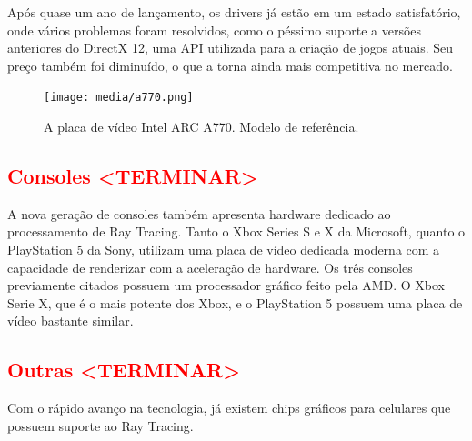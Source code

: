 \documentclass[journal]{IEEEtran}
\begin{document}
Após quase um ano de lançamento, os drivers já estão em um estado satisfatório, onde vários
problemas foram resolvidos, como o péssimo suporte a versões anteriores do DirectX 12, uma
API utilizada para a criação de jogos atuais. Seu preço também foi diminuído, o que a torna
ainda mais competitiva no mercado.

\begin{figure}[ht]
  \centering
  \texttt{[image: media/a770.png]}
  \caption{A placa de vídeo Intel ARC A770. Modelo de referência.}
  \label{img_a440}
\end{figure}


\subsection{\textcolor{red}{\textbf{Consoles <TERMINAR>}}}
A nova geração de consoles também apresenta hardware dedicado ao processamento de Ray Tracing.
Tanto o Xbox Series S e X da Microsoft, quanto o PlayStation 5 da Sony, utilizam uma placa de
vídeo dedicada moderna com a capacidade de renderizar com a aceleração de hardware. Os três 
consoles previamente citados possuem um processador gráfico feito pela AMD. O Xbox Serie X,
que é o mais potente dos Xbox, e o PlayStation 5 possuem uma placa de vídeo bastante similar.


\subsection{\textcolor{red}{\textbf{Outras <TERMINAR>}}}
Com o rápido avanço na tecnologia, já existem chips gráficos para celulares que possuem suporte
ao Ray Tracing.


\end{document}
